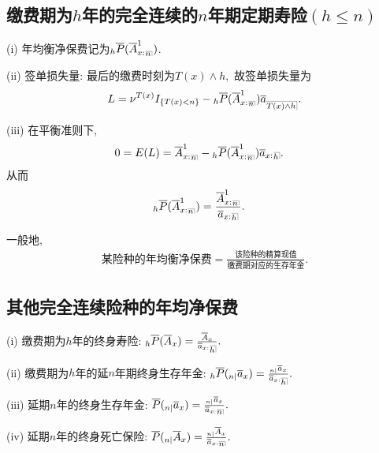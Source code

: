 \documentclass[lang=cn,10pt]{elegantbook}
\makeatletter
\DeclareRobustCommand{\annu}[1]{_{%
    \def\arraystretch{0}%
    \setlength\arraycolsep{1pt}%
    \setlength\arrayrulewidth{.2pt}%
    \begin{array}[b]{@{}c|}\hline
        \\[\arraycolsep]%
        \scriptstyle #1%
    \end{array}%
}}
\makeatother
\begin{document}
\subsection{缴费期为$h$年的完全连续的$n$年期定期寿险$(h\le n)$}
\begin{proposition}
    (i) 年均衡净保费记为${}_{h}\overline{P}(\overline{A}^{1}_{x:}{}_{\annu n})$.

(ii) 签单损失量: 最后的缴费时刻为$T(x)\land h,$ 故签单损失量为
$$L=\nu^{T(x)}I_{\{T(x)<n\}}-{}_{h}\overline{P}(\overline{A}^{1}_{x:
}{}_{\annu n})\overline{a}_{\annu{T(x)\land h}}.$$

(iii) 在平衡准则下,
\begin{align*}
0 &= E(L) = \overline{A}^{1}_{x:}{}_{\annu n} - {}_{h}\overline{P}(\overline{A}^{1}_{x:}{}_{\annu n}) \overline{a}_{x: }{}{\annu{h}}.
\end{align*}
从而
\begin{align*}
& {}_{h}\overline{P}(\overline{A}^{1}_{x:}{}_{\annu n})=\frac{\overline{A}^{1}_{x:}{}_{\annu n}}{\overline{a}_{x:}{}{\annu{h}}}.
\end{align*}
\end{proposition}

\begin{remark} 一般地,
    \begin{align*}
  \text{某险种的年均衡净保费}=\frac{\text{该险种的精算现值}}{\text{缴费期对应的生存年金}}.
  \end{align*}
  \end{remark}

\subsection{其他完全连续险种的年均净保费}

\begin{proposition}
    (i) 缴费期为$h$年的终身寿险: $_{h}\overline{P}(\overline{A}_{x})=\frac{\overline{A}_{x}}{\overline{a}_{x:}{}\annu h}.$

(ii) 缴费期为$h$年的延$n$年期终身生存年金: $_{h}\overline{P}(_{n|}\overline{a}_{x})=\frac{_{n|}\overline{a}_{x}}{\overline{a}_{x:}{}{\annu h}}.$

(iii) 延期$n$年的终身生存年金: $\overline{P}(_{n|}\overline{a}_{x})=\frac{_{n|}\overline{a}_{x}}{\overline{a}_{x:}{}\annu n}.$

(iv) 延期$n$年的终身死亡保险: $\overline{P}(_{n|}\overline{A}_{x})=\frac{_{n|}\overline{A}_{x}}{\overline{a}_{x:}{}\annu n}.$
\end{proposition}
\end{document}
